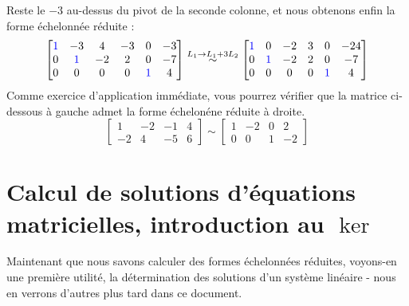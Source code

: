 Reste le $-3$ au-dessus du pivot de la seconde colonne, et nous obtenons enfin la forme échelonnée réduite :
$$
\begin{bmatrix}
 \color{blue}1 & -3 &  4 & -3 &  0 & -3\\
 0 & \color{blue}1 &  -2 & 2 &  0 &  -7\\
 0 &  0 & 0 &  0 &  \color{blue}1 & 4
\end{bmatrix}
\overset{L_1 \to L_1 + 3L_2}{\sim}
\begin{bmatrix}
 \color{blue}1 & 0 &  -2 & 3 &  0 & -24\\
 0 & \color{blue}1 &  -2 & 2 &  0 &  -7\\
 0 &  0 & 0 &  0 &  \color{blue}1 & 4
\end{bmatrix}
$$
Comme exercice d'application immédiate, vous pourrez vérifier que la matrice ci-dessous à gauche admet la forme échelonéne réduite à droite.
$$
\begin{bmatrix}
1 & -2 & -1 & 4\\
-2 & 4 & -5 & 6
\end{bmatrix}
\sim
\begin{bmatrix}
1 & -2 & 0 & 2\\
0 & 0 & 1 & -2
\end{bmatrix}
$$

\section{Calcul de solutions d'équations matricielles, introduction au $\ker$}
\noindent Maintenant que nous savons calculer des formes échelonnées réduites, voyons-en une première utilité, la détermination des solutions d'un système linéaire - nous en verrons d'autres plus tard dans ce document. \\

